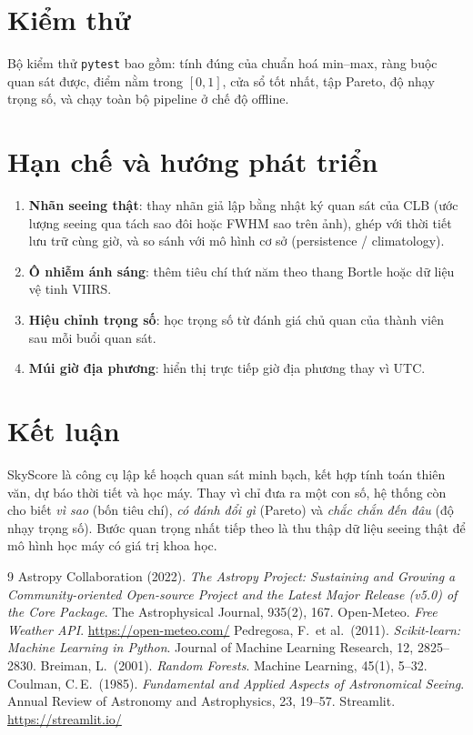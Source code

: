 \documentclass[12pt,a4paper]{article}
\begin{document}
\section{Kiểm thử}
Bộ kiểm thử \texttt{pytest} bao gồm: tính đúng của chuẩn hoá min--max, ràng buộc quan sát
được, điểm nằm trong $[0,1]$, cửa sổ tốt nhất, tập Pareto, độ nhạy trọng số, và chạy toàn bộ
pipeline ở chế độ offline.

\section{Hạn chế và hướng phát triển}
\begin{enumerate}[nosep]
  \item \textbf{Nhãn seeing thật}: thay nhãn giả lập bằng nhật ký quan sát của CLB (ước lượng
        seeing qua tách sao đôi hoặc FWHM sao trên ảnh), ghép với thời tiết lưu trữ cùng giờ,
        và so sánh với mô hình cơ sở (persistence / climatology).
  \item \textbf{Ô nhiễm ánh sáng}: thêm tiêu chí thứ năm theo thang Bortle hoặc dữ liệu vệ tinh VIIRS.
  \item \textbf{Hiệu chỉnh trọng số}: học trọng số từ đánh giá chủ quan của thành viên sau mỗi buổi quan sát.
  \item \textbf{Múi giờ địa phương}: hiển thị trực tiếp giờ địa phương thay vì UTC.
\end{enumerate}

\section{Kết luận}
SkyScore là công cụ lập kế hoạch quan sát minh bạch, kết hợp tính toán thiên văn, dự báo thời
tiết và học máy. Thay vì chỉ đưa ra một con số, hệ thống còn cho biết \emph{vì sao} (bốn tiêu
chí), \emph{có đánh đổi gì} (Pareto) và \emph{chắc chắn đến đâu} (độ nhạy trọng số). Bước quan
trọng nhất tiếp theo là thu thập dữ liệu seeing thật để mô hình học máy có giá trị khoa học.

\begin{thebibliography}{9}
 Astropy Collaboration (2022). \emph{The Astropy Project: Sustaining and
  Growing a Community-oriented Open-source Project and the Latest Major Release (v5.0) of the
  Core Package}. The Astrophysical Journal, 935(2), 167.
 Open-Meteo. \emph{Free Weather API}. \url{https://open-meteo.com/}
 Pedregosa, F.\ et al.\ (2011). \emph{Scikit-learn: Machine Learning in
  Python}. Journal of Machine Learning Research, 12, 2825--2830.
 Breiman, L.\ (2001). \emph{Random Forests}. Machine Learning, 45(1), 5--32.
 Coulman, C.\,E.\ (1985). \emph{Fundamental and Applied Aspects of
  Astronomical Seeing}. Annual Review of Astronomy and Astrophysics, 23, 19--57.
 Streamlit. \url{https://streamlit.io/}
\end{thebibliography}
\end{document}
